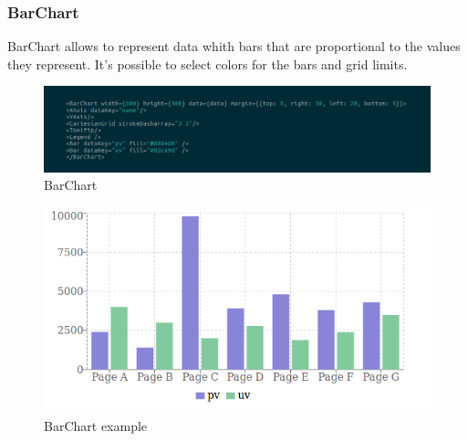 \subsubsection{BarChart}
BarChart allows to represent data whith bars that are proportional to the values they represent. It's possible to select colors for the bars and grid limits.
\begin{figure}[H]
	\centering
	\includegraphics[width=14cm]{../../documenti/UserManualFramework/framework_view/18framework_view_bar.png}
	\caption{BarChart}
\end{figure}
\begin{figure}[H]
	\centering
	\includegraphics[width=14cm]{../../documenti/UserManualFramework/framework_view/barchart.png}
	\caption{BarChart example}
\end{figure}

